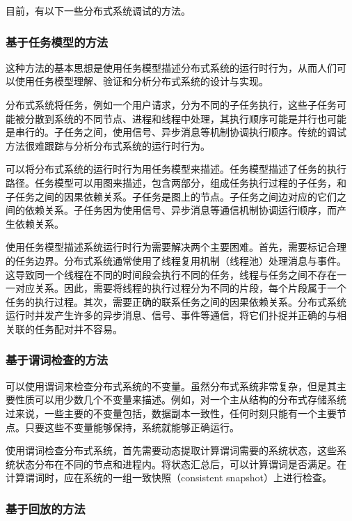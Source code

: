 目前，有以下一些分布式系统调试的方法。

\subsubsection*{基于任务模型的方法}

这种方法的基本思想是使用任务模型描述分布式系统的运行时行为，从而人们可
以使用任务模型理解、验证和分析分布式系统的设计与实现。

分布式系统将任务，例如一个用户请求，分为不同的子任务执行，这些子任务可
能被分散到系统的不同节点、进程和线程中处理，其执行顺序可能是并行也可能
是串行的。子任务之间，使用信号、异步消息等机制协调执行顺序。传统的调试
方法很难跟踪与分析分布式系统的运行时行为。

可以将分布式系统的运行时行为用任务模型来描述。任务模型描述了任务的执行
路径。任务模型可以用图来描述，包含两部分，组成任务执行过程的子任务，和
子任务之间的因果依赖关系。子任务是图上的节点。子任务之间边对应的它们之
间的依赖关系。子任务因为使用信号、异步消息等通信机制协调运行顺序，而产
生依赖关系。

使用任务模型描述系统运行时行为需要解决两个主要困难。首先，需要标记合理
的任务边界。分布式系统通常使用了线程复用机制（线程池）处理消息与事件。
这导致同一个线程在不同的时间段会执行不同的任务，线程与任务之间不存在一
一对应关系。因此，需要将线程的执行过程分为不同的片段，每个片段属于一个
任务的执行过程。其次，需要正确的联系任务之间的因果依赖关系。分布式系统
运行时并发产生许多的异步消息、信号、事件等通信，将它们扑捉并正确的与相
关联的任务配对并不容易。

\subsubsection*{基于谓词检查的方法}

可以使用谓词来检查分布式系统的不变量。虽然分布式系统非常复杂，但是其主
要性质可以用少数几个不变量来描述。例如，对一个主从结构的分布式存储系统
过来说，一些主要的不变量包括，数据副本一致性，任何时刻只能有一个主要节
点。只要这些不变量能够保持，系统就能够正确运行。

使用谓词检查分布式系统，首先需要动态提取计算谓词需要的系统状态，这些系
统状态分布在不同的节点和进程内。将状态汇总后，可以计算谓词是否满足。在
计算谓词时，应在系统的一组一致快照（consistent snapshot）上进行检查。

\subsubsection*{基于回放的方法}

